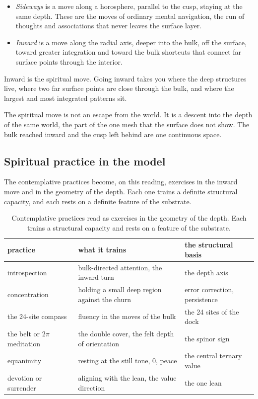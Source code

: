 \begin{itemize}
\item \emph{Sideways} is a move along a horosphere, parallel to the cusp, staying at the same depth. These are the moves of ordinary mental navigation, the run of thoughts and associations that never leaves the surface layer.
\item \emph{Inward} is a move along the radial axis, deeper into the bulk, off the surface, toward greater integration and toward the bulk shortcuts that connect far surface points through the interior.
\end{itemize}

Inward is the spiritual move. Going inward takes you where the deep structures live, where two far surface points are close through the bulk, and where the largest and most integrated patterns sit.

\begin{principle}
The spiritual move is not an escape from the world. It is a descent into the depth of the same world, the part of the one mesh that the surface does not show. The bulk reached inward and the cusp left behind are one continuous space.
\end{principle}

\subsection{Spiritual practice in the model}

The contemplative practices become, on this reading, exercises in the inward move and in the geometry of the depth. Each one trains a definite structural capacity, and each rests on a definite feature of the substrate.

\begin{table}[ht]
\centering
\begin{tabular}{@{}p{3.4cm}p{4.4cm}p{4.0cm}@{}}
\toprule
practice & what it trains & the structural basis \\
\midrule
introspection & bulk-directed attention, the inward turn & the depth axis \\
concentration & holding a small deep region against the churn & error correction, persistence \\
the 24-site compass & fluency in the moves of the bulk & the 24 sites of the dock \\
the belt or $2\pi$ meditation & the double cover, the felt depth of orientation & the spinor sign \\
equanimity & resting at the still tone, $0$, peace & the central ternary value \\
devotion or surrender & aligning with the lean, the value direction & the one lean \\
\bottomrule
\end{tabular}
\caption{Contemplative practices read as exercises in the geometry of the depth. Each trains a structural capacity and rests on a feature of the substrate.}
\label{tab:spiritual-practices}
\end{table}

